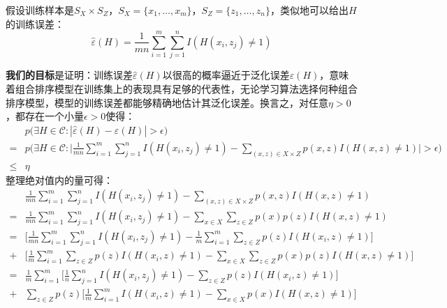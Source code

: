 假设训练样本是$S_X\times S_Z$，$S_X=\{x_1,\ldots,x_m\}$，$S_Z=\{z_1,\ldots,z_n\}$，类似地可以给出$H$的训练误差：
\begin{equation}
    \hat{\varepsilon}(H) = \frac{1}{mn} \sum\limits_{i=1}^m \sum\limits_{j=1}^n I(H(x_i,z_j)\ne 1)
\end{equation}

\textbf{我们的目标}是证明：训练误差$\hat{\varepsilon}(H)$以很高的概率逼近于泛化误差$\varepsilon(H)$，意味着组合排序模型在训练集上的表现具有足够的代表性，无论学习算法选择何种组合排序模型，模型的训练误差都能够精确地估计其泛化误差。换言之，对任意$\eta>0$，都存在一个小量$\epsilon>0$使得：
\begin{equation}
    \begin{array}{ll}
       & p\big(\exists H\in \mathcal{C}:|\hat{\varepsilon}(H) - \varepsilon(H)| > \epsilon \big) \\
       = & p\bigg(\exists H\in \mathcal{C}:\bigg|\frac{1}{mn} \sum\limits_{i=1}^m \sum\limits_{j=1}^n I(H(x_i,z_j)\ne 1) - \sum\limits_{(x,z)\in X\times Z} p(x, z) I(H(x,z)\ne 1) \bigg| > \epsilon \bigg) \\
       \le & \eta
    \end{array}
\end{equation}
整理绝对值内的量可得：
\begin{equation}
    \begin{array}{ll}
       & \frac{1}{mn} \sum\limits_{i=1}^m \sum\limits_{j=1}^n I(H(x_i,z_j)\ne 1) - \sum\limits_{(x,z)\in X\times Z} p(x, z) I(H(x,z)\ne 1) \\
      = & \frac{1}{mn} \sum\limits_{i=1}^m \sum\limits_{j=1}^n I(H(x_i,z_j)\ne 1) - \sum\limits_{x\in X}\sum\limits_{z\in Z} p(x)p(z) I(H(x,z)\ne 1) \\
      = & \bigg[\frac{1}{mn} \sum\limits_{i=1}^m \sum\limits_{j=1}^n I(H(x_i,z_j)\ne 1) - \frac{1}{m} \sum\limits_{i=1}^m \sum\limits_{z\in Z} p(z) I(H(x_i,z)\ne 1)\bigg] \\
      + & \bigg[\frac{1}{m} \sum\limits_{i=1}^m \sum\limits_{z\in Z} p(z) I(H(x_i,z)\ne 1) - \sum\limits_{x\in X}\sum\limits_{z\in Z} p(x)p(z) I(H(x,z)\ne 1)\bigg]\\
      = & \frac{1}{m} \sum\limits_{i=1}^m \bigg[\frac{1}{n} \sum\limits_{j=1}^n I(H(x_i,z_j)\ne 1)-\sum\limits_{z\in Z} p(z) I(H(x_i,z)\ne 1)\bigg]\\
      + & \sum\limits_{z\in Z} p(z)\bigg[\frac{1}{m} \sum\limits_{i=1}^m I(H(x_i,z)\ne 1) -  \sum\limits_{x\in X} p(x) I(H(x,z)\ne 1) \bigg]\\
    \end{array}
\end{equation}

